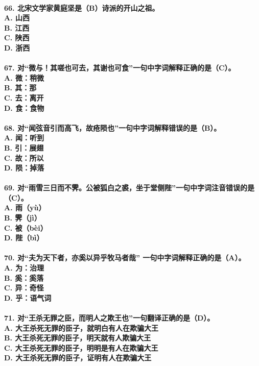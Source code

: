 \documentclass[UTF8]{ctexart} %
\begin{document}
\paragraph{
66. 北宋文学家黄庭坚是（\color{red}B\color{black}）诗派的开山之祖。 \\
    A. 山西 \\
    B. 江西 \\
    C. 陕西 \\
    D. 浙西
}
\paragraph{
67. 对“微与！其嗟也可去，其谢也可食”一句中字词解释正确的是（\color{red}C\color{black}）。 \\
    A. 微：稍微 \\
    B. 其：那 \\
    C. 去：离开 \\
    D. 食：食物
}
\paragraph{
68. 对“闻弦音引而高飞，故疮陨也”一句中字词解释错误的是（\color{red}B\color{black}）。 \\
    A. 闻：听到 \\
    B. 引：展翅 \\
    C. 故：所以 \\
    D. 陨：掉落
}
\paragraph{
69. 对“雨雪三日而不霁。公被狐白之裘，坐于堂侧陛”一句中字词注音错误的是（\color{red}C\color{black}）。 \\
    A. 雨（yù） \\
    B. 霁（jì） \\
    C. 被（bèi） \\
    D. 陛（bì）
}
\paragraph{
70. 对“夫为天下者，亦奚以异乎牧马者哉” 一句中字词解释正确的是（\color{red}A\color{black}）。 \\
    A. 为：治理 \\
    B. 奚：奚落 \\
    C. 异：奇怪 \\
    D. 乎：语气词
}
\paragraph{
71. 对“王杀无罪之臣，而明人之欺王也”一句翻译正确的是（\color{red}D\color{black}）。 \\
    A. 大王杀死无罪的臣子，就明白有人在欺骗大王 \\
    B. 大王杀死无罪的臣子，明天就有人欺骗大王 \\
    C. 大王杀死无罪的臣子，明明是有人在欺骗大王 \\
    D. 大王杀死无罪的臣子，证明有人在欺骗大王
}
\end{document}
